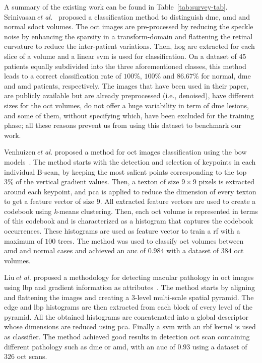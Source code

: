 A summary of the existing work can be found in Table~\ref{tab:survey-tab}.
Srinivasan\,\textit{et al.}~\cite{Srinivasan2014} proposed a classification method to distinguish \ac{dme}, \ac{amd} and normal \ac{sdoct} volumes.
The \ac{oct} images are pre-processed by reducing the speckle noise by enhancing the sparsity in a transform-domain and flattening the retinal curvature to reduce the inter-patient variations.
Then, \ac{hog} are extracted for each slice of a volume and a linear \ac{svm} is used for classification.
On a dataset of 45 patients equally subdivided into the three aforementioned classes, this method leads to a correct classification rate of $100 \%$, $100 \%$ and $86.67 \%$ for normal, \ac{dme} and \ac{amd} patients, respectively.
The images that have been used in their paper, are publicly available but are already preprocessed (i.e., denoised), have different sizes for the \ac{oct} volumes, do not offer a huge variability in term of \ac{dme} lesions, and some of them, without specifying which, have been excluded for the training phase; all these reasons prevent us from using this dataset to benchmark our work. 

Venhuizen\,\textit{et al.} proposed a method for \ac{oct} images classification using the \ac{bow} models~\cite{Venhuizen2015}.
The method starts with the detection and selection of keypoints in each individual B-scan, by keeping the most salient points corresponding to the top $3 \%$ of the vertical gradient values. Then, a texton of size $9 \times 9$ pixels is extracted around each keypoint, and \ac{pca} is applied to reduce the dimension of every texton to get a feature vector of size $9$.
All extracted feature vectors are used to create a codebook using \textit{k}-means clustering.
Then, each \ac{oct} volume is represented in terms of this codebook and is characterized as a histogram that captures the codebook occurrences.
These histograms are used as feature vector to train a \ac{rf} with a maximum of $100$ trees.
The method was used to classify \ac{oct} volumes between \ac{amd} and normal cases and achieved an \ac{auc} of $0.984$ with a dataset of $384$ \ac{oct} volumes.

Liu\,\textit{et al.} proposed a methodology for detecting macular pathology in \ac{oct} images using \ac{lbp} and gradient information as attributes~\cite{Liu2011}.
The method starts by aligning and flattening the images and creating a $3$-level multi-scale spatial pyramid.
The edge and \ac{lbp} histograms are then extracted from each block of every level of the pyramid.
All the obtained histograms are concatenated into a global descriptor whose dimensions are reduced using \ac{pca}.
Finally a \ac{svm} with an \ac{rbf} kernel is used as classifier.
The method achieved good results in detection \ac{oct} scan containing different pathology such as \ac{dme} or \ac{amd}, with an \ac{auc} of $0.93$ using a dataset of $326$ \ac{oct} scans.

